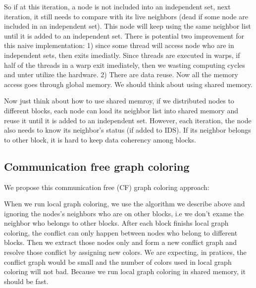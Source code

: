 \documentclass[12pt] {article}
\begin{document}
So if at this iteration, a node is not included into an independent set, next iteration, it still needs to compare with its live neighbors (dead if some node are included in an independent set). This node will keep using the same neighbor list until it is added to an independent set. There is potential two improvement for this naive implementation: 1) since some thread will access node who are in independent sets, then exits imediatly. Since threads are executed in warps, if half of the threads in a warp exit imediately, then we wasting computing cycles and unter utilize the hardware. 2) There are data reuse. Now all the memory access goes through global memory. We should think about using shared memory.

Now just think about how to use shared memroy, if we distributed nodes to different blocks, each node can load its neighbor list into shared memory and reuse it until it is added to an independent set. However, each iteration, the node also needs to know its neighbor's status (if added to IDS). If its neighbor belongs to other block, it is hard to keep data coherency among blocks. 

\subsection{Communication free graph coloring}
We propose this communication free (CF) graph coloring approach:
\begin{figure}[!tbh]
\centering        
   \caption{ }
   \label{fig:fig2}
\end{figure} 

When we run local graph coloring, we use the algorithm we describe above and ignoring the nodes's neighbors who are on other blocks, i.e we don't exame the neighbor who belongs to other blocks. After each block finishs local graph coloring, the conflict can only happen between nodes who belong to different blocks. Then we extract those nodes only and form a new conflict graph and resolve those conflict by assigning new colors. We are expecting, in pratices, the conflict graph would be small and the number of colors used in local graph coloring will not bad. Because we run local graph coloring in shared memory, it should be fast. 
\end{document}
